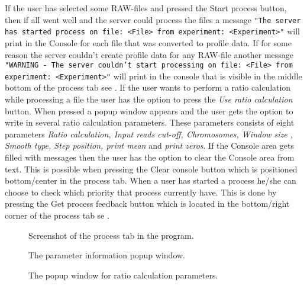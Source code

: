 If the user has selected some RAW-files and pressed the Start process button, then if all went well and the server could process the files a message \texttt{"The server has started process on file: <File> from experiment: <Experiment>"} will print in the Console for each file that was converted to profile data. If for some reason the server couldn't create profile data for any RAW-file another message \texttt{"WARNING - The server couldn't start processing on file: <File> from experiment: <Experiment>"} will print in the console that is visible in the middle bottom of the process tab see . If the user wants to perform a ratio calculation while processing a file the user has the option to press the \emph{Use ratio calculation} button. When pressed a popup window appears and the user gets the option to write in several ratio calculation parameters. These parameters consists of eight parameters \emph{Ratio calculation, Input reads cut-off, Chromosomes, Window size , Smooth type, Step position, print mean} and  \emph{print zeros}. If the Console area gets filled with messages then the user has the option to clear the Console area from text. This is possible when pressing the Clear console button which is positioned bottom/center in the process tab. When a user has started a process he/she can choose to check which priority that process currently have. This is done by pressing the Get process feedback button which is located in the bottom/right corner of the process tab se .




\begin{figure}[htb]
	\caption{Screenshot of the process tab in the program.}
	\label{fig:des_process-view}
\end{figure}

\begin{figure}[htb]
	\caption{The parameter information popup window.}
	\label{fig:des_process-view-info}
\end{figure}

\begin{figure}[htb]
	\caption{The popup window for ratio calculation parameters.}
	\label{fig:des_process-view-ratio}
\end{figure}

\FloatBarrier

